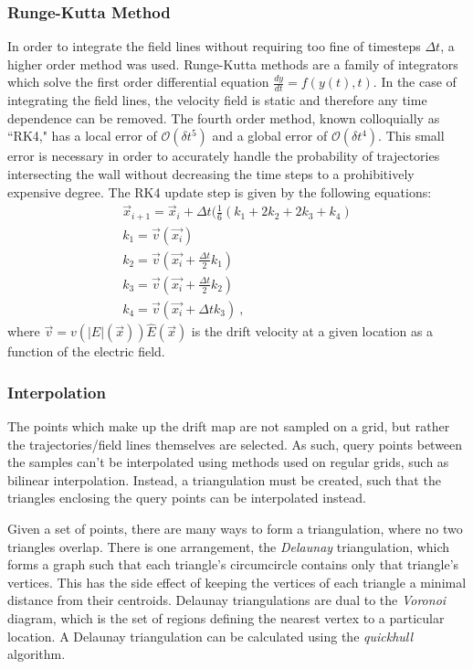 \subsubsection{Runge-Kutta Method}
\label{sec:RK4}
In order to integrate the field lines without requiring too fine of timesteps $\Delta t$, a higher order method was used.
Runge-Kutta methods are a family of integrators which solve the first order differential equation $\frac{dy}{dt} = f(y(t),t)$.
In the case of integrating the field lines, the velocity field is static and therefore any time dependence can be removed.
The fourth order method, known colloquially as ``RK4," has a local error of $\mathcal{O}(\delta t^5)$ and a global error of $\mathcal{O}(\delta t^4)$.
This small error is necessary in order to accurately handle the probability of trajectories intersecting the wall without decreasing the time steps to a prohibitively expensive degree.
The RK4 update step is given by the following equations:
\begin{align}
    \vec{x}_{i+1} = \vec{x}_i+\Delta t (\frac{1}{6}(k_1 + 2k_2 + 2k_3 + k_4)\\
    \label{eq:rk4}
    k_1 =  \vec{v}(\vec{x_i})\\ 
    k_2 = \vec{v}(\vec{x_i} + \frac{\Delta t}{2}k_1 )\\ 
    k_3 = \vec{v}(\vec{x_i} + \frac{\Delta t}{2}k_2 )\\ 
    k_4 = \vec{v}(\vec{x_i} + \Delta t k_3 )~,
\end{align}
where $\vec{v} = v(|E|(\vec{x}))\hat{E}(\vec{x})$ is the drift velocity at a given location as a function of the electric field.
\subsubsection{Interpolation}
The points which make up the drift map are not sampled on a grid, but rather the trajectories/field lines themselves are selected.
As such, query points between the samples can't be interpolated using methods used on regular grids, such as bilinear interpolation. 
Instead, a triangulation must be created, such that the triangles enclosing the query points can be interpolated instead.

Given a set of points, there are many ways to form a triangulation, where no two triangles overlap. 
There is one arrangement, the \textit{Delaunay} triangulation, which forms a graph such that each triangle's circumcircle contains only that triangle's vertices.
This has the side effect of keeping the vertices of each triangle a minimal distance from their centroids.
Delaunay triangulations are dual to the \textit{Voronoi} diagram, which is the set of regions defining the nearest vertex to a particular location.
A Delaunay triangulation can be calculated using the \textit{quickhull} algorithm.

